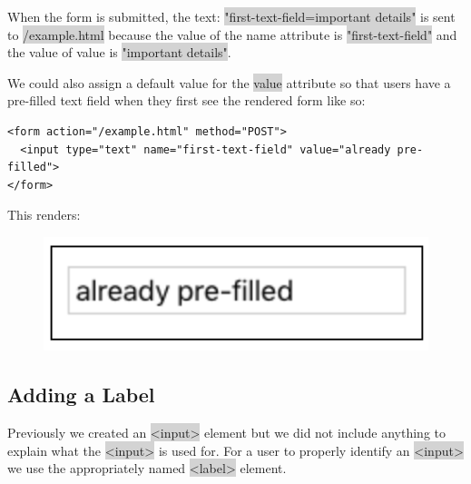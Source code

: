 \documentclass[11pt]{article}
\begin{document}
\vspace{-4mm}
When the form is submitted, the text: \colorbox{lightgray}{"first-text-field=important details"} is sent to \colorbox{lightgray}{/example.html} because the value of the name attribute is \colorbox{lightgray}{"first-text-field"} and the value of value is \colorbox{lightgray}{"important details"}.

We could also assign a default value for the \colorbox{lightgray}{value} attribute so that users have a pre-filled text field when they first see the rendered form like so:
\begin{lstlisting}
<form action="/example.html" method="POST">
  <input type="text" name="first-text-field" value="already pre-filled">
</form>
\end{lstlisting}
This renders:
\begin{figure}[H]
\includegraphics[scale = 0.5]{3_4}
\centering
\end{figure}
\vspace{-4mm}

\subsection{Adding a Label}
Previously we created an \colorbox{lightgray}{<input>} element but we did not include anything to explain what the \colorbox{lightgray}{<input>} is used for. For a user to properly identify an \colorbox{lightgray}{<input>} we use the appropriately named \colorbox{lightgray}{<label>} element.
\end{document}
